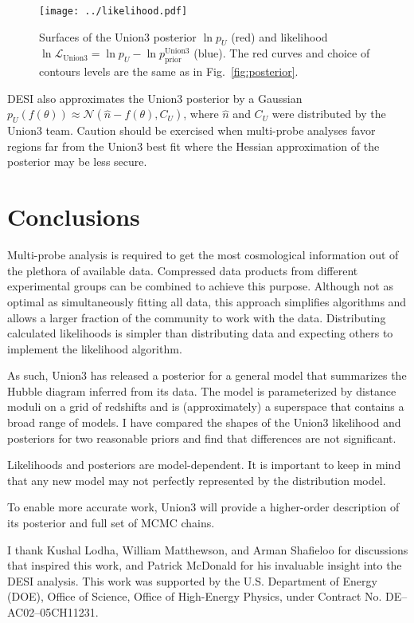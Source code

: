 \documentclass[11pt,a4paper]{article}
\begin{document}
\begin{figure}[htbp] %
   \centering
   \texttt{[image: ../likelihood.pdf]} 
   \caption{Surfaces of the Union3 posterior $\ln{p_U}$ (red) and likelihood $\ln{\mathcal{L}_\text{Union3}}  = \ln{p_U}-\ln{p_\text{prior}^\text{Union3}}$ (blue).   The red curves
   and choice of contours levels are the same as in Fig.~\ref{fig:posterior}.\label{fig:likelihood}}
\end{figure}

DESI also approximates the Union3 posterior by a Gaussian ${p_U(f(\theta))} \approx \mathcal{N}( \hat{n}-f(\theta) , C_U)$,
where $\hat{n}$ and $C_U$ were distributed by the Union3 team.
Caution should be exercised when multi-probe analyses favor regions far from the Union3 best fit  where the Hessian approximation of the
posterior may be less secure.

\section{Conclusions}
\label{sec:conclusions}
Multi-probe  analysis is required to get the most cosmological information out of the plethora of available data. 
Compressed data products from different experimental groups can be combined to achieve this purpose.
Although not as optimal as simultaneously fitting all data, this approach simplifies algorithms and allows a larger
fraction of
the community to work with the data.  Distributing calculated likelihoods is simpler than distributing data and expecting others to implement the likelihood algorithm.

As such, Union3 has released a posterior for a general model that summarizes the Hubble diagram inferred from its data.
The model is parameterized by distance moduli on a grid of redshifts and is (approximately) a superspace that
contains a broad range of models.    I have compared the shapes of the Union3 likelihood and posteriors for two
reasonable priors and find that differences are not significant.

Likelihoods and posteriors are model-dependent.  It is important to keep in mind that any new model may not perfectly represented by the 
distribution model.

To enable more accurate work, Union3 will provide a higher-order description of its posterior and full set of MCMC chains.

\acknowledgments
I thank Kushal Lodha, William Matthewson, and Arman Shafieloo for discussions that inspired this work, 
and Patrick McDonald for his invaluable insight into the DESI analysis.
This work was supported by the U.S. Department of Energy (DOE), Office
of Science, Office of High-Energy Physics, under Contract No. DE–AC02–05CH11231.


\end{document}
